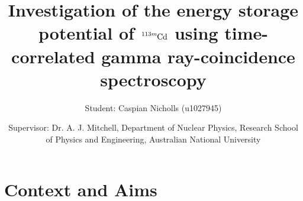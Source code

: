 \documentclass[12pt,a4paper]{article}
\begin{document}
\title{Investigation of the energy storage potential of $\ce{^{113m}Cd}$ using time-correlated gamma ray-coincidence spectroscopy}%
\author{Student: Caspian Nicholls (u1027945)}
\date{Supervisor: Dr. A. J. Mitchell, Department of Nuclear Physics, Research School of Physics and Engineering, Australian National University}

\maketitle
\section*{Context and Aims}

\end{document}
